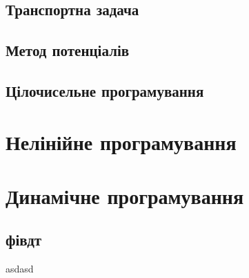 \documentclass[a5paper,10pt]{book}
\begin{document}
\section{Транспортна задача}

\section{Метод потенціалів}

\section{Цілочисельне програмування}

\chapter{Нелінійне програмування}

\chapter{Динамічне програмування}

\section{фівдт}

asdasd
\end{document}
